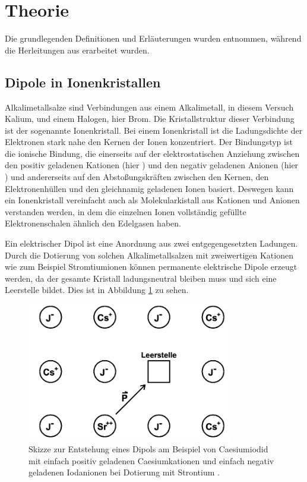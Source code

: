 \section{Theorie}
\label{sec:Theorie}

Die grundlegenden Definitionen und Erläuterungen wurden \cite{AshcroftMermin} entnommen, während die Herleitungen aus \cite{anleitungalt} erarbeitet wurden.

\subsection{Dipole in Ionenkristallen}

Alkalimetallsalze sind Verbindungen aus einem Alkalimetall, in diesem Versuch Kalium, und einem Halogen, hier Brom. Die Kristallstruktur dieser Verbindung ist der sogenannte Ionenkristall. Bei einem Ionenkristall ist die Ladungsdichte der Elektronen stark nahe den Kernen der Ionen konzentriert. Der Bindungstyp ist die ionische Bindung, die einerseits auf der elektrostatischen Anziehung zwischen den positiv geladenen Kationen (hier ) und den negativ geladenen Anionen (hier ) und andererseits auf den Abstoßungskräften zwischen den Kernen, den Elektronenhüllen und den gleichnamig geladenen Ionen basiert.
Deswegen kann ein Ionenkristall vereinfacht auch als Molekularkistall aus Kationen und Anionen verstanden werden, in dem die einzelnen Ionen vollständig gefüllte Elektronenschalen ähnlich den Edelgasen haben.

Ein elektrischer Dipol ist eine Anordnung aus zwei entgegengesetzten Ladungen.
Durch die Dotierung von solchen Alkalimetallsalzen mit zweiwertigen Kationen wie zum Beispiel Stromtiumionen  können permanente elektrische Dipole erzeugt werden, da der gesamte Kristall ladungsneutral bleiben muss und sich eine Leerstelle bildet. Dies ist in Abbildung \ref{fig:dipolIonenkristall} zu sehen.

\begin{figure}
  \centering
  \includegraphics[width=0.8\textwidth]{data/kristall.png}
  \caption{Skizze zur Entstehung eines Dipols am Beispiel von Caesiumiodid mit einfach positiv geladenen Caesiumkationen und einfach negativ geladenen Iodanionen bei Dotierung mit Strontium \cite{anleitungalt}.}
  \label{fig:dipolIonenkristall}
\end{figure}


